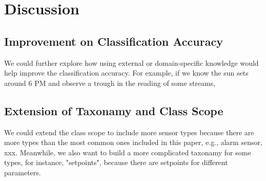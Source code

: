 \section{Discussion}
\subsection{Improvement on Classification Accuracy}
We could further explore how using external or domain-specific knowledge would help improve the classification accuracy. For example, if we know the sun sets around 6 PM and observe a trough in the reading of some streams, 

\subsection{Extension of Taxonamy and Class Scope}
We could extend the class scope to include more sensor types because there are more types than the most common ones included in this paper, e.g., alarm sensor, xxx. Meanwhile, we also want to build a more complicated taxonamy for some types, for instance, "setpoints", because there are setpoints for different parameters.  